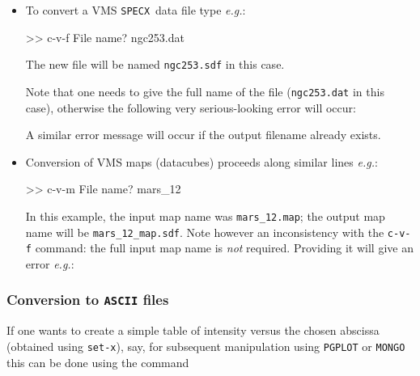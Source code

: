 \documentclass[11pt,twoside]{starlink}
\providecommand{\eg}{\textit{e.g.}}
\providecommand{\SPECX}{\texttt{SPECX}}
\begin{document}
\begin{itemize}
\item
To convert a VMS \SPECX\ data file type \eg :
\begin{terminalv}
 >> c-v-f
 File name? ngc253.dat
\end{terminalv}
The new file will be named \texttt{ngc253.sdf} in this case.

Note that one needs to give the full name of the file ({\tt{ngc253.dat}}
in this case), otherwise the following very serious-looking error will
occur:

A similar error message will occur if the output filename already exists.
\item
Conversion of VMS maps (datacubes) proceeds along similar lines \eg :
\begin{terminalv}
 >> c-v-m
 File name? mars_12
\end{terminalv}

In this example, the input map name was \texttt{mars\_12.map}; the output
map name will be \texttt{mars\_12\_map.sdf}. Note however an inconsistency
with the \texttt{c-v-f} command: the full input map name is \textit{not}
required. Providing it will give an error \eg :

\end{itemize}

\subsubsection{Conversion to \texttt{ASCII} files}
\label{sec:specx2ascii}
If one wants to create a simple table of intensity versus the chosen
abscissa (obtained using \texttt{set-x}), say, for subsequent
manipulation using \texttt{PGPLOT} or \texttt{MONGO} this can be done using
the command
\end{document}
